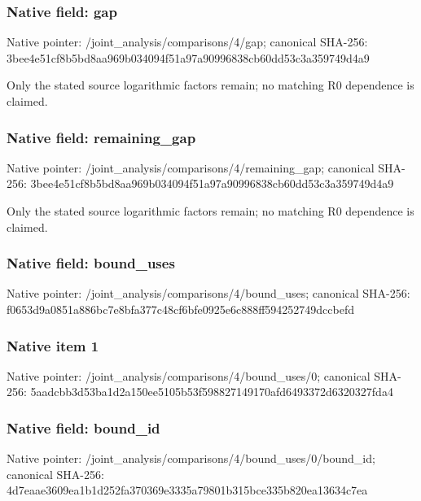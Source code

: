 \documentclass[10pt,a4paper]{article}
\begin{document}
\subsubsection{Native field: gap}


Native pointer: /joint\_analysis/comparisons/4/gap; canonical SHA-256: 3bee4e51cf8b5bd8aa969b03\allowbreak{}4094f51a97a90996838cb60d\allowbreak{}d53c3a359749d4a9


Only the stated source logarithmic factors remain; no matching R0 dependence is claimed.


\subsubsection{Native field: remaining\_gap}


Native pointer: /joint\_analysis/comparis\allowbreak{}ons/4/remaining\_gap; canonical SHA-256: 3bee4e51cf8b5bd8aa969b03\allowbreak{}4094f51a97a90996838cb60d\allowbreak{}d53c3a359749d4a9


Only the stated source logarithmic factors remain; no matching R0 dependence is claimed.


\subsubsection{Native field: bound\_uses}


Native pointer: /joint\_analysis/comparis\allowbreak{}ons/4/bound\_uses; canonical SHA-256: f0653d9a0851a886bc7e8bfa\allowbreak{}377c48cf6bfe0925e6c888ff\allowbreak{}594252749dccbefd



\subsubsection{Native item 1}


Native pointer: /joint\_analysis/comparis\allowbreak{}ons/4/bound\_uses/0; canonical SHA-256: 5aadcbb3d53ba1d2a150ee51\allowbreak{}05b53f598827149170afd649\allowbreak{}3372d6320327fda4



\subsubsection{Native field: bound\_id}


Native pointer: /joint\_analysis/comparis\allowbreak{}ons/4/bound\_uses/0/bound\allowbreak{}\_id; canonical SHA-256: 4d7eaae3609ea1b1d252fa37\allowbreak{}0369e3335a79801b315bce33\allowbreak{}5b820ea13634c7ea
\end{document}
